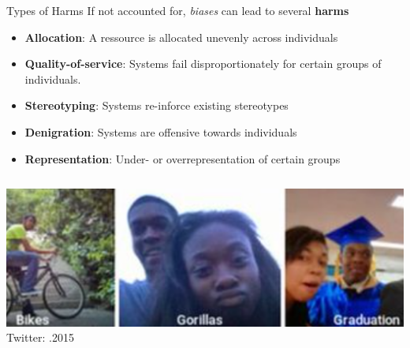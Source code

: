 \documentclass[11pt,compress,t,notes=noshow, xcolor=table]{beamer}
\begin{document}
\begin{vbframe}{Types of Harms}
    If not accounted for, \textit{biases} can lead to several \textbf{harms}
    \begin{itemize}
        \small
        \item \textbf{Allocation}: A ressource is allocated unevenly across individuals
        \item \textbf{Quality-of-service}: Systems fail disproportionately for certain groups of individuals.
        \item \textbf{Stereotyping}: Systems re-inforce existing stereotypes
        \item \textbf{Denigration}: Systems are offensive towards individuals
        \item \textbf{Representation}: Under- or overrepresentation of certain groups
    \end{itemize}

    \begin{columns} 
        \begin{column}{0.5\textwidth}
            \begin{center}
                \vfill
                \includegraphics[height=0.25\textheight]{figures/gorilla.png}
                \tiny{Twitter: .2015}
                \vfill 
            \end{center}
        \end{column}
        

\end{columns}
\end{vbframe}
\end{document}
